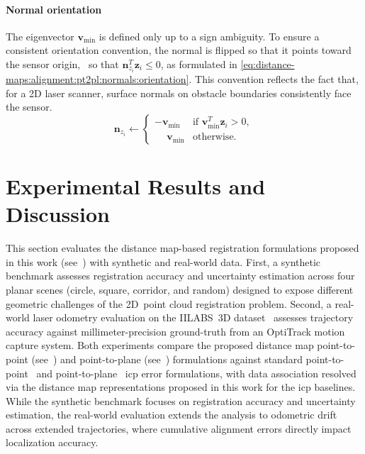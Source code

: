\paragraph{Normal orientation}
The eigenvector $\mathbf{v}_{\min}$ is defined only up to a sign ambiguity.
To ensure a consistent orientation convention, the normal is flipped so that
it points toward the sensor origin, \ie\ so that
$\mathbf{n}_{z_i}^T \mathbf{z}_i \leq 0$, as formulated in
\eqref{eq:distance-maps:alignment:pt2pl:normals:orientation}.
This convention reflects the fact that, for a 2D laser scanner, surface normals
on obstacle boundaries consistently face the sensor.
\begin{equation}
\label{eq:distance-maps:alignment:pt2pl:normals:orientation}
\mathbf{n}_{z_i} \leftarrow
\begin{cases}
-\mathbf{v}_{\min} & \text{if } \mathbf{v}_{\min}^T \mathbf{z}_i > 0, \\
\phantom{-}\mathbf{v}_{\min} & \text{otherwise.}
\end{cases}
\end{equation}

\section{Experimental Results and Discussion}\label{sec:distance-maps:results}

This section evaluates the distance map-based registration formulations proposed
in this work (see~) with synthetic and
real-world data. First, a synthetic benchmark assesses registration accuracy and
uncertainty estimation across four planar scenes
(circle, square, corridor, and random) designed to expose different
geometric challenges of the 2D~point cloud registration problem.
Second, a real-world laser odometry evaluation on the IILABS~3D
dataset~\cite{ribeiro:access:2025} assesses trajectory accuracy against
millimeter-precision ground-truth from an OptiTrack motion capture system.
Both experiments compare the proposed distance map point-to-point
(see~) and point-to-plane
(see~) formulations against
standard point-to-point~\cite{besl-mckay:tpami:1992} and
point-to-plane~\cite{chen-medioni:icra:1991} \gls{icp} error formulations,
with data association resolved via the distance map representations
proposed in this work for the \gls{icp} baselines.
While the synthetic benchmark focuses on
registration accuracy and uncertainty estimation, the real-world evaluation
extends the analysis to odometric drift across extended trajectories,
where cumulative alignment errors directly impact localization accuracy.

